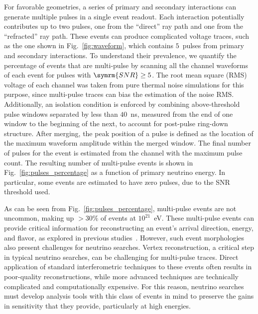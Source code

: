   For favorable geometries, a series of primary and secondary interactions can generate multiple pulses in a single event readout.
  Each interaction potentially contributes up to two pulses, one from the ``direct'' ray path and one from the ``refracted'' ray path.
  These events can produce complicated voltage traces, such as the one shown in Fig.~\ref{fig:waveform}, which contains $5$~pulses from primary and secondary interactions.
  To understand their prevalence, we quantify the percentage of events that are multi-pulse by scanning all the channel waveforms of each event for pulses with $\symrm{SNR} \geq 5$.
  The root mean square (RMS) voltage of each channel was taken from pure thermal noise simulations for this purpose, since multi-pulse traces can bias the estimation of the noise RMS.
  Additionally, an isolation condition is enforced by combining above-threshold pulse windows separated by less than $40$~ns, measured from the end of one window to the beginning of the next, to account for post-pulse ring-down structure.
  After merging, the peak position of a pulse is defined as the location of the maximum waveform amplitude within the merged window.
  The final number of pulses for the event is estimated from the channel with the maximum pulse count.
  The resulting number of multi-pulse events is shown in Fig.~\ref{fig:pulses_percentage} as a function of primary neutrino energy.
  In particular, some events are estimated to have zero pulses, due to the SNR threshold used.

  As can be seen from Fig.~\ref{fig:pulses_percentage}, multi-pulse events are not uncommon, making up $>30\%$ of events at $10^{21}$~eV.
  These multi-pulse events can provide critical information for reconstructing an event's arrival direction, energy, and flavor, as explored in previous studies~\citep{nuradiomc2, secondaries_garciafernandez}.
  However, such event morphologies also present challenges for neutrino searches.
  Vertex reconstruction, a critical step in typical neutrino searches, can be challenging for multi-pulse traces.
  Direct application of standard interferometric techniques to these events often results in poor-quality reconstructions, while more advanced techniques are technically complicated and computationally expensive.
  For this reason, neutrino searches must develop analysis tools with this class of events in mind to preserve the gains in sensitivity that they provide, particularly at high energies.

